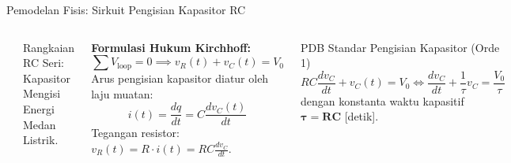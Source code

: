 \documentclass[aspectratio=169,10pt]{beamer}
\begin{document}
\begin{frame}{Pemodelan Fisis: Sirkuit Pengisian Kapasitor RC}
  \begin{columns}
    \begin{center}
    \end{center}
    \vspace{-0.2cm}
    \begin{center}
      \footnotesize Rangkaian RC Seri: Kapasitor Mengisi Energi Medan Listrik.
    \end{center}

    \textbf{Formulasi Hukum Kirchhoff:}
    \begin{equation}
      \sum V_{\text{loop}} = 0 \implies v_R(t) + v_C(t) = V_0
    \end{equation}
    Arus pengisian kapasitor diatur oleh laju muatan:
    \begin{equation*}
      i(t) = \frac{dq}{dt} = C \frac{dv_C(t)}{dt}
    \end{equation*}
    Tegangan resistor: $v_R(t) = R \cdot i(t) = R C \frac{dv_C}{dt}$.
    \begin{block}{PDB Standar Pengisian Kapasitor (Orde 1)}
      \begin{equation}
        R C \frac{dv_C}{dt} + v_C(t) = V_0 \iff \frac{dv_C}{dt} + \frac{1}{\tau} v_C = \frac{V_0}{\tau}
      \end{equation}
      dengan konstanta waktu kapasitif $\mathbf{\tau = RC}$ [detik].
    \end{block}
  \end{columns}
\end{frame}
\end{document}
